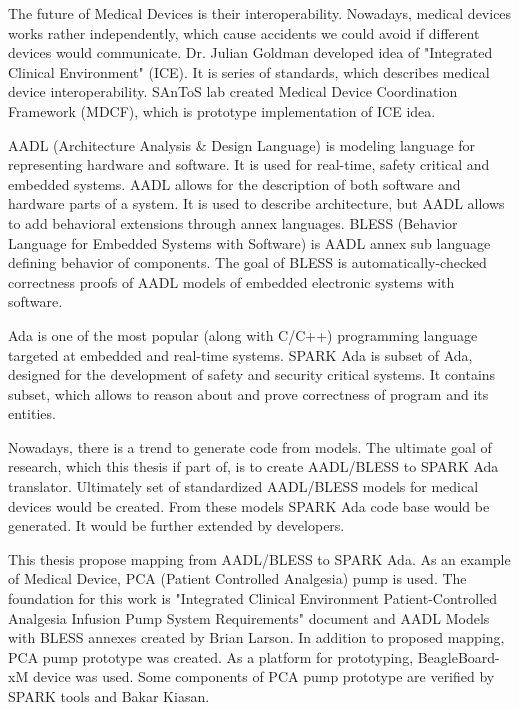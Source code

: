 
\pagestyle{empty}
\setlength{\baselineskip}{0.8cm}

\indent


The future of Medical Devices is their interoperability. Nowadays, medical devices works rather independently, which cause accidents we could avoid if different devices would communicate. Dr. Julian Goldman developed idea of "Integrated Clinical Environment" (ICE). It is series of standards, which describes medical device interoperability. SAnToS lab created Medical Device Coordination Framework (MDCF), which is prototype implementation of ICE idea.

AADL (Architecture Analysis \& Design Language) is modeling language for representing hardware and software. It is used for real-time, safety critical and embedded systems. AADL allows for the description of both software and hardware parts of a system. It is used to describe architecture, but AADL allows to add behavioral extensions through annex languages. BLESS (Behavior Language for Embedded Systems with Software) is AADL annex sub language defining behavior of components. The goal of BLESS is automatically-checked correctness proofs of AADL models of embedded electronic systems with software.

Ada is one of the most popular (along with C/C++) programming language targeted at embedded and real-time systems. SPARK Ada is subset of Ada, designed for the development of safety and security critical systems. It contains subset, which allows to reason about and prove correctness of program and its entities.

Nowadays, there is a trend to generate code from models. The ultimate goal of research, which this thesis if part of, is to create AADL/BLESS to SPARK Ada translator. Ultimately set of standardized AADL/BLESS models for medical devices would be created. From these models SPARK Ada code base would be generated. It would be further extended by developers.

This thesis propose mapping from AADL/BLESS to SPARK Ada. As an example of Medical Device, PCA (Patient Controlled Analgesia) pump is used. The foundation for this work is "Integrated Clinical Environment Patient-Controlled Analgesia Infusion Pump System Requirements" document \cite{PcaReq} and AADL Models with BLESS annexes created by Brian Larson. In addition to proposed mapping, PCA pump prototype was created. As a platform for prototyping, BeagleBoard-xM device was used. Some components of PCA pump prototype are verified by SPARK tools and Bakar Kiasan.
